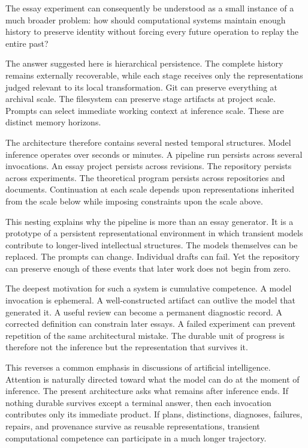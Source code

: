 \documentclass[11pt]{article}
\begin{document}
The essay experiment can consequently be understood as a small instance of a much broader problem: how should computational systems maintain enough history to preserve identity without forcing every future operation to replay the entire past?

The answer suggested here is hierarchical persistence. The complete history remains externally recoverable, while each stage receives only the representations judged relevant to its local transformation. Git can preserve everything at archival scale. The filesystem can preserve stage artifacts at project scale. Prompts can select immediate working context at inference scale. These are distinct memory horizons.

The architecture therefore contains several nested temporal structures. Model inference operates over seconds or minutes. A pipeline run persists across several invocations. An essay project persists across revisions. The repository persists across experiments. The theoretical program persists across repositories and documents. Continuation at each scale depends upon representations inherited from the scale below while imposing constraints upon the scale above.

This nesting explains why the pipeline is more than an essay generator. It is a prototype of a persistent representational environment in which transient models contribute to longer-lived intellectual structures. The models themselves can be replaced. The prompts can change. Individual drafts can fail. Yet the repository can preserve enough of these events that later work does not begin from zero.

The deepest motivation for such a system is cumulative competence. A model invocation is ephemeral. A well-constructed artifact can outlive the model that generated it. A useful review can become a permanent diagnostic record. A corrected definition can constrain later essays. A failed experiment can prevent repetition of the same architectural mistake. The durable unit of progress is therefore not the inference but the representation that survives it.

This reverses a common emphasis in discussions of artificial intelligence. Attention is naturally directed toward what the model can do at the moment of inference. The present architecture asks what remains after inference ends. If nothing durable survives except a terminal answer, then each invocation contributes only its immediate product. If plans, distinctions, diagnoses, failures, repairs, and provenance survive as reusable representations, transient computational competence can participate in a much longer trajectory.
\end{document}
